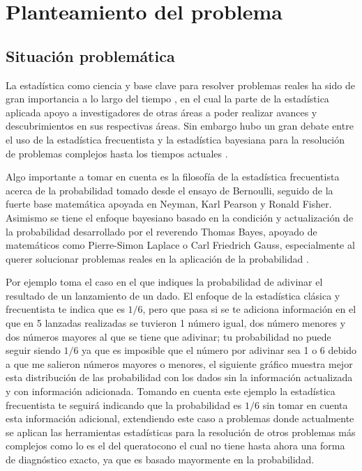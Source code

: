 \tableofcontents
\newpage

\section{Planteamiento del problema}
\subsection{Situación problemática}
La estadística como ciencia y base clave para resolver problemas reales ha sido de gran importancia a lo largo del tiempo \parencite{spiegelhalter2023arte}, en el cual la parte de la estadística aplicada apoyo a investigadores de otras áreas a poder realizar avances y descubrimientos en sus respectivas áreas. Sin embargo hubo un gran debate 
entre el uso de la estadística frecuentista y la estadística bayesiana para la resolución de problemas complejos hasta los tiempos actuales \parencite{clayton2021bernoulli}.

Algo importante a tomar en cuenta es la filosofía de la estadística frecuentista acerca de la probabilidad tomado desde el ensayo de Bernoulli, seguido de la fuerte base matemática apoyada en Neyman, Karl Pearson y Ronald Fisher. Asimismo se tiene el enfoque bayesiano basado en la condición y actualización de la probabilidad desarrollado por el reverendo Thomas Bayes, apoyado de matemáticos como Pierre-Simon Laplace o Carl Friedrich Gauss, especialmente al querer solucionar problemas reales en la aplicación de la probabilidad \parencite{clayton2021bernoulli}.

Por ejemplo \cite{clayton2021bernoulli} toma el caso en el que indiques la probabilidad de adivinar el resultado de un lanzamiento de un dado. El enfoque de la estadística clásica y frecuentista te indica que es $1/6$, pero que pasa si se te adiciona información en el que en 5 lanzadas realizadas se tuvieron 1 número igual, dos número menores y dos números mayores al que se tiene que adivinar; tu probabilidad no puede seguir siendo $1/6$ ya que es imposible que el número por adivinar sea 1 o 6 debido a que me salieron números mayores o menores, el siguiente gráfico muestra mejor esta distribución de las probabilidad con los dados sin la información actualizada y con información adicionada. Tomando en cuenta este ejemplo la estadística frecuentista te seguirá indicando que la probabilidad es $1/6$ sin tomar en cuenta esta información adicional, extendiendo este caso a problemas donde actualmente se aplican las herramientas estadísticas para la resolución de otros problemas más complejos como lo es el del queratocono el cual no tiene hasta ahora una forma de diagnóstico exacto, ya que es basado mayormente en la probabilidad.

